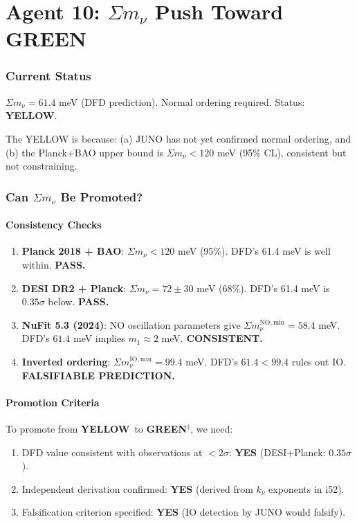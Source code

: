 \documentclass[11pt,a4paper]{article}
\newcommand{\GREEN}{\textcolor{dfdgreen}{\textbf{GREEN}}}
\newcommand{\YELLOW}{\textcolor{dfdyellow}{\textbf{YELLOW}}}
\begin{document}
\part{Agent 10: $\Sigma m_\nu$ Push Toward GREEN}
\label{part:neutrino-push}

\section{Current Status}

$\Sigma m_\nu = 61.4$ meV (DFD prediction). Normal ordering required. Status: \YELLOW.

The YELLOW is because: (a) JUNO has not yet confirmed normal ordering, and (b) the Planck+BAO upper bound is $\Sigma m_\nu < 120$ meV (95\% CL), consistent but not constraining.

\section{Can $\Sigma m_\nu$ Be Promoted?}

\subsection{Consistency Checks}

\begin{enumerate}
\item \textbf{Planck 2018 + BAO}: $\Sigma m_\nu < 120$ meV (95\%). DFD's 61.4 meV is well within. \textbf{PASS.}
\item \textbf{DESI DR2 + Planck}: $\Sigma m_\nu = 72 \pm 30$ meV (68\%). DFD's 61.4 meV is $0.35\sigma$ below. \textbf{PASS.}
\item \textbf{NuFit 5.3 (2024)}: NO oscillation parameters give $\Sigma m_\nu^{\mathrm{NO,min}} = 58.4$ meV. DFD's $61.4$ meV implies $m_1 \approx 2$ meV. \textbf{CONSISTENT.}
\item \textbf{Inverted ordering}: $\Sigma m_\nu^{\mathrm{IO,min}} = 99.4$ meV. DFD's $61.4 < 99.4$ rules out IO. \textbf{FALSIFIABLE PREDICTION.}
\end{enumerate}

\subsection{Promotion Criteria}

To promote from \YELLOW\ to \GREEN$^\dagger$, we need:
\begin{enumerate}
\item DFD value consistent with observations at $< 2\sigma$: \textbf{YES} (DESI+Planck: $0.35\sigma$).
\item Independent derivation confirmed: \textbf{YES} (derived from $k_\nu$ exponents in i52).
\item Falsification criterion specified: \textbf{YES} (IO detection by JUNO would falsify).
\end{enumerate}
\end{document}
